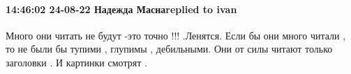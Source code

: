  
 
 
 
 

\paragraph{14:46:02 24-08-22 Надежда Маснаreplied to ivan}

Много они читать не будут -это точно !!! .Ленятся. Если бы они много читали ,
то не были бы тупими , глупимы , дебильными. Они от силы читают только
заголовки . И картинки смотрят .
